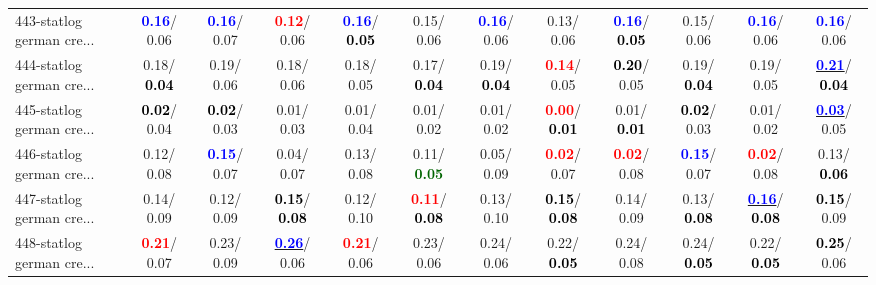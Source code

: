 \begin{table}[h]
\begin{center}
{\begin{tabular}{lc|c|c|c|c|c|c|c|c|c|c}
443-statlog german cre... & \textcolor{blue}{\textbf{  0.16}}/  0.06 & \textcolor{blue}{\textbf{  0.16}}/  0.07 & \textcolor{red}{\textbf{  0.12}}/  0.06 & \textcolor{blue}{\textbf{  0.16}}/\textcolor{black}{\textbf{  0.05}} &   0.15/  0.06 & \textcolor{blue}{\textbf{  0.16}}/  0.06 &   0.13/  0.06 & \textcolor{blue}{\textbf{  0.16}}/\textcolor{black}{\textbf{  0.05}} &   0.15/  0.06 & \textcolor{blue}{\textbf{  0.16}}/  0.06 & \textcolor{blue}{\textbf{  0.16}}/  0.06 \\
444-statlog german cre... &   0.18/\textcolor{black}{\textbf{  0.04}} &   0.19/  0.06 &   0.18/  0.06 &   0.18/  0.05 &   0.17/\textcolor{black}{\textbf{  0.04}} &   0.19/\textcolor{black}{\textbf{  0.04}} & \textcolor{red}{\textbf{  0.14}}/  0.05 & \textcolor{black}{\textbf{  0.20}}/  0.05 &   0.19/\textcolor{black}{\textbf{  0.04}} &   0.19/  0.05 & \underline{\textcolor{blue}{\textbf{  0.21}}}/\textcolor{black}{\textbf{  0.04}} \\ \hline
445-statlog german cre... & \textcolor{black}{\textbf{  0.02}}/  0.04 & \textcolor{black}{\textbf{  0.02}}/  0.03 &   0.01/  0.03 &   0.01/  0.04 &   0.01/  0.02 &   0.01/  0.02 & \textcolor{red}{\textbf{  0.00}}/\textcolor{black}{\textbf{  0.01}} &   0.01/\textcolor{black}{\textbf{  0.01}} & \textcolor{black}{\textbf{  0.02}}/  0.03 &   0.01/  0.02 & \underline{\textcolor{blue}{\textbf{  0.03}}}/  0.05 \\
446-statlog german cre... &   0.12/  0.08 & \textcolor{blue}{\textbf{  0.15}}/  0.07 &   0.04/  0.07 &   0.13/  0.08 &   0.11/\textcolor{darkgreen}{\textbf{  0.05}} &   0.05/  0.09 & \textcolor{red}{\textbf{  0.02}}/  0.07 & \textcolor{red}{\textbf{  0.02}}/  0.08 & \textcolor{blue}{\textbf{  0.15}}/  0.07 & \textcolor{red}{\textbf{  0.02}}/  0.08 &   0.13/\textcolor{black}{\textbf{  0.06}} \\
447-statlog german cre... &   0.14/  0.09 &   0.12/  0.09 & \textcolor{black}{\textbf{  0.15}}/\textcolor{black}{\textbf{  0.08}} &   0.12/  0.10 & \textcolor{red}{\textbf{  0.11}}/\textcolor{black}{\textbf{  0.08}} &   0.13/  0.10 & \textcolor{black}{\textbf{  0.15}}/\textcolor{black}{\textbf{  0.08}} &   0.14/  0.09 &   0.13/\textcolor{black}{\textbf{  0.08}} & \underline{\textcolor{blue}{\textbf{  0.16}}}/\textcolor{black}{\textbf{  0.08}} & \textcolor{black}{\textbf{  0.15}}/  0.09 \\
448-statlog german cre... & \textcolor{red}{\textbf{  0.21}}/  0.07 &   0.23/  0.09 & \underline{\textcolor{blue}{\textbf{  0.26}}}/  0.06 & \textcolor{red}{\textbf{  0.21}}/  0.06 &   0.23/  0.06 &   0.24/  0.06 &   0.22/\textcolor{black}{\textbf{  0.05}} &   0.24/  0.08 &   0.24/\textcolor{black}{\textbf{  0.05}} &   0.22/\textcolor{black}{\textbf{  0.05}} & \textcolor{black}{\textbf{  0.25}}/  0.06 \\\end{tabular}}\label{stratsALCKappa13AllReduxa}
\end{center}
\end{table}
